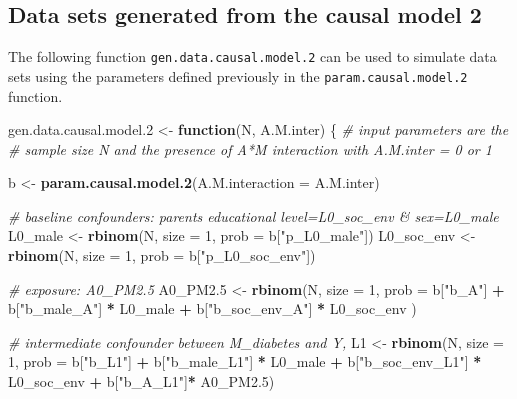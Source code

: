 \documentclass[
]{book}
\newenvironment{Shaded}{\begin{snugshade}}{\end{snugshade}}
\newcommand{\AttributeTok}[1]{\textcolor[rgb]{0.13,0.29,0.53}{#1}}
\newcommand{\CommentTok}[1]{\textcolor[rgb]{0.56,0.35,0.01}{\textit{#1}}}
\newcommand{\ControlFlowTok}[1]{\textcolor[rgb]{0.13,0.29,0.53}{\textbf{#1}}}
\newcommand{\DecValTok}[1]{\textcolor[rgb]{0.00,0.00,0.81}{#1}}
\newcommand{\FloatTok}[1]{\textcolor[rgb]{0.00,0.00,0.81}{#1}}
\newcommand{\FunctionTok}[1]{\textcolor[rgb]{0.13,0.29,0.53}{\textbf{#1}}}
\newcommand{\NormalTok}[1]{#1}
\newcommand{\OtherTok}[1]{\textcolor[rgb]{0.56,0.35,0.01}{#1}}
\newcommand{\SpecialCharTok}[1]{\textcolor[rgb]{0.81,0.36,0.00}{\textbf{#1}}}
\newcommand{\StringTok}[1]{\textcolor[rgb]{0.31,0.60,0.02}{#1}}
\begin{document}
\subsection{Data sets generated from the causal model 2}\label{data-sets-generated-from-the-causal-model-2}

The following function \texttt{gen.data.causal.model.2} can be used to simulate data sets using the parameters defined previously in the \texttt{param.causal.model.2} function.

\begin{Shaded}
\begin{Highlighting}[]
\NormalTok{gen.data.causal.model}\FloatTok{.2} \OtherTok{\textless{}{-}} \ControlFlowTok{function}\NormalTok{(N, A.M.inter) \{ }\CommentTok{\# input parameters are the }
  \CommentTok{\#   sample size N and the presence of A*M interaction with A.M.inter = 0 or 1}
  
\NormalTok{  b }\OtherTok{\textless{}{-}} \FunctionTok{param.causal.model.2}\NormalTok{(}\AttributeTok{A.M.interaction =}\NormalTok{ A.M.inter)}
    
  \CommentTok{\# baseline confounders: parent\textquotesingle{}s educational level=L0\_soc\_env \& sex=L0\_male}
\NormalTok{  L0\_male }\OtherTok{\textless{}{-}} \FunctionTok{rbinom}\NormalTok{(N, }\AttributeTok{size =} \DecValTok{1}\NormalTok{, }\AttributeTok{prob =}\NormalTok{ b[}\StringTok{"p\_L0\_male"}\NormalTok{]) }
\NormalTok{  L0\_soc\_env }\OtherTok{\textless{}{-}} \FunctionTok{rbinom}\NormalTok{(N, }\AttributeTok{size =} \DecValTok{1}\NormalTok{, }\AttributeTok{prob =}\NormalTok{ b[}\StringTok{"p\_L0\_soc\_env"}\NormalTok{])  }
  
  \CommentTok{\# exposure: A0\_PM2.5}
\NormalTok{  A0\_PM2}\FloatTok{.5} \OtherTok{\textless{}{-}} \FunctionTok{rbinom}\NormalTok{(N, }\AttributeTok{size =} \DecValTok{1}\NormalTok{, }\AttributeTok{prob =}\NormalTok{  b[}\StringTok{"b\_A"}\NormalTok{] }\SpecialCharTok{+} 
\NormalTok{                     b[}\StringTok{"b\_male\_A"}\NormalTok{] }\SpecialCharTok{*}\NormalTok{ L0\_male }\SpecialCharTok{+} 
\NormalTok{                     b[}\StringTok{"b\_soc\_env\_A"}\NormalTok{] }\SpecialCharTok{*}\NormalTok{ L0\_soc\_env ) }
  
  \CommentTok{\# intermediate confounder between M\_diabetes and Y, }
\NormalTok{  L1 }\OtherTok{\textless{}{-}} \FunctionTok{rbinom}\NormalTok{(N, }\AttributeTok{size =} \DecValTok{1}\NormalTok{, }\AttributeTok{prob =}\NormalTok{ b[}\StringTok{"b\_L1"}\NormalTok{] }\SpecialCharTok{+}
\NormalTok{                 b[}\StringTok{"b\_male\_L1"}\NormalTok{] }\SpecialCharTok{*}\NormalTok{ L0\_male }\SpecialCharTok{+}
\NormalTok{                 b[}\StringTok{"b\_soc\_env\_L1"}\NormalTok{] }\SpecialCharTok{*}\NormalTok{ L0\_soc\_env }\SpecialCharTok{+} 
\NormalTok{                 b[}\StringTok{"b\_A\_L1"}\NormalTok{]}\SpecialCharTok{*}\NormalTok{ A0\_PM2}\FloatTok{.5}\NormalTok{)}
  

\end{Highlighting}
\end{Shaded}
\end{document}
